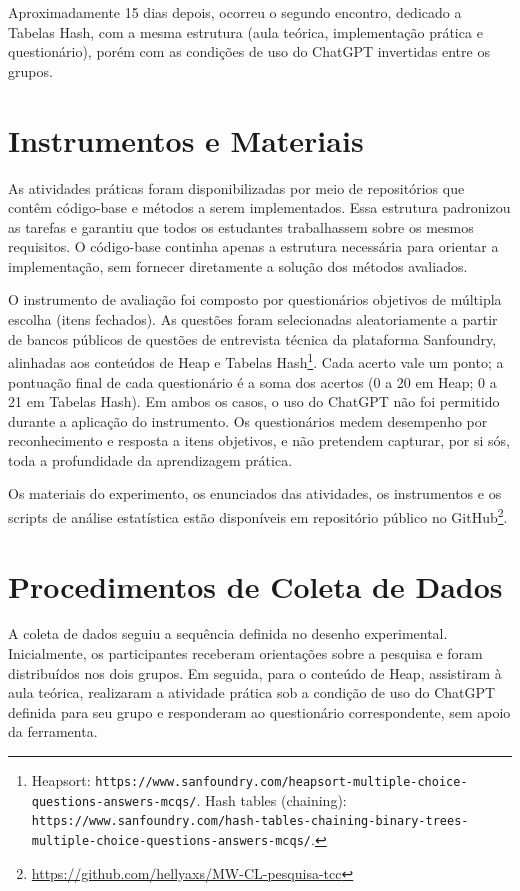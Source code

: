 Aproximadamente 15 dias depois, ocorreu o segundo encontro, dedicado a Tabelas Hash, com a mesma estrutura (aula teórica, implementação prática e questionário), porém com as condições de uso do ChatGPT invertidas entre os grupos.

\section{Instrumentos e Materiais}
\label{sec:instrumentos-materiais}

As atividades práticas foram disponibilizadas por meio de repositórios que contêm código-base e métodos a serem implementados. Essa estrutura padronizou as tarefas e garantiu que todos os estudantes trabalhassem sobre os mesmos requisitos. O código-base continha apenas a estrutura necessária para orientar a implementação, sem fornecer diretamente a solução dos métodos avaliados.

O instrumento de avaliação foi composto por questionários objetivos de múltipla escolha (itens fechados). As questões foram selecionadas aleatoriamente a partir de bancos públicos de questões de entrevista técnica da plataforma Sanfoundry, alinhadas aos conteúdos de Heap e Tabelas Hash\footnote{Heapsort: \texttt{https://www.sanfoundry.com/heapsort-multiple-choice-questions-answers-mcqs/}. Hash tables (chaining): \texttt{https://www.sanfoundry.com/hash-tables-chaining-binary-trees-multiple-choice-questions-answers-mcqs/}.}. Cada acerto vale um ponto; a pontuação final de cada questionário é a soma dos acertos (0 a 20 em Heap; 0 a 21 em Tabelas Hash). Em ambos os casos, o uso do ChatGPT não foi permitido durante a aplicação do instrumento. Os questionários medem desempenho por reconhecimento e resposta a itens objetivos, e não pretendem capturar, por si sós, toda a profundidade da aprendizagem prática.

Os materiais do experimento, os enunciados das atividades, os instrumentos e os scripts de análise estatística estão disponíveis em repositório público no GitHub\footnote{\url{https://github.com/hellyaxs/MW-CL-pesquisa-tcc}}.

\section{Procedimentos de Coleta de Dados}
\label{sec:procedimentos-coleta}

A coleta de dados seguiu a sequência definida no desenho experimental. Inicialmente, os participantes receberam orientações sobre a pesquisa e foram distribuídos nos dois grupos. Em seguida, para o conteúdo de Heap, assistiram à aula teórica, realizaram a atividade prática sob a condição de uso do ChatGPT definida para seu grupo e responderam ao questionário correspondente, sem apoio da ferramenta.

